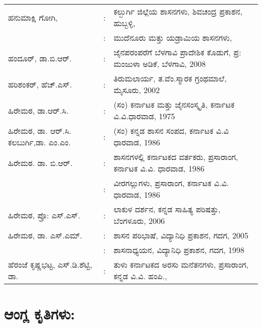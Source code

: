 \begin{longtable}[l]{@{}>{\raggedright}p{4.7cm}cp{9.2cm}<{\raggedright}@{}}
ಹನುಮಾಕ್ಷಿ ಗೋಗಿ, & : & ಕಲ್ಬುರ್ಗಿ ಜಿಲ್ಲೆಯ ಶಾಸನಗಳು, ಶಿವಚಂದ್ರ ಪ್ರಕಾಶನ, ಹುಬ್ಬಳ್ಳಿ,\\
& : & ಮುದೆನೂರು ಮತ್ತು ಯಡ್ರಾಮಿಯ ಶಾಸನಗಳು,\\
ಹಂದೂರ್​, ಡಾ.ಬಿ.ಆರ್​. & : & ಜೈನಪರಂಪರೆಗೆ ಬೆಳಗಾವಿ ಪ್ರಾದೇಶಿಕ ಕೊಡುಗೆ, ಪ್ರ: ಮಂಜುಳಾ ಅಡಿಕೆ, ಬೆಳಗಾವಿ, 2008\\
ಹರಿಶಂಕರ್​, ಹೆಚ್​.ಎಸ್​. & : & ತಿರುಮಲಾರ್ಯ, ತ.ವೆಂ.ಸ್ಮಾರಕ ಗ್ರಂಥಮಾಲೆ, ಮೈಸೂರು, 2002\\
ಹಿರೇಮಠ, ಡಾ.ಆರ್​.ಸಿ. & : & (ಸಂ) ಕರ್ನಾಟಕ ಮತ್ತು ಜೈನಸಂಸ್ಕೃತಿ, ಕರ್ನಾಟಕ ವಿ.ವಿ.ಧಾರವಾಡ, 1975\\
ಹಿರೇಮಠ, ಡಾ. ಆರ್​.ಸಿ. ಕಲಬುರ್ಗಿ,ಡಾ. ಎಂ.ಎಂ. & : &  (ಸಂ) ಕನ್ನಡ ಶಾಸನ ಸಂಪದ, ಕರ್ನಾಟಕ ವಿ.ವಿ ಧಾರವಾಡ, 1986\\
ಹಿರೇಮಠ. ಡಾ. ಬಿ.ಆರ್​. & : &  ಶಾಸನಗಳಲ್ಲಿ ಕರ್ನಾಟಕದ ವರ್ತಕರು, ಪ್ರಸಾರಾಂಗ, ಕರ್ನಾಟಕ ವಿ.ವಿ. ಧಾರವಾಡ, 1986\\
& : & ವೀರಗಲ್ಲುಗಳು, ಪ್ರಸಾರಾಂಗ, ಕರ್ನಾಟಕ ವಿ.ವಿ. ಧಾರವಾಡ, 1986\\
ಹಿರೇಮಠ, ಪ್ರೊ: ಎಸ್​.ಎಸ್​. & : &  ಲಾಕುಳ ದರ್ಶನ, ಕನ್ನಡ ಸಾಹಿತ್ಯ ಪರಿಷತ್ತು, ಬೆಂಗಳೂರು, 2006\\
ಹಿರೇಮಠ, ಡಾ. ಎಸ್​.ಎಮ್. & : & ಶಾಸನ ಪರಿಭಾಷೆ, ವಿದ್ಯಾನಿಧಿ ಪ್ರಕಾಶನ, ಗದಗ, 2005\\
& : & ಶಾಸನಾಧ್ಯಯನ, ವಿದ್ಯಾನಿಧಿ ಪ್ರಕಾಶನ, ಗದಗ, 1998\\
ಹೆರಂಜೆ ಕೃಷ್ಣಭಟ್ಟ, ಎಸ್​.ಡಿ.ಶೆಟ್ಟಿ, ಡಾ. & : &  ತುಳು ಕರ್ನಾಟಕದ ಅರಸು ಮನೆತನಗಳು, ಪ್ರಸಾರಾಂಗ, ಕನ್ನಡ ವಿ.ವಿ. ಹಂಪಿ.,
\end{longtable}

\newpage

\section*{ಆಂಗ್ಲ ಕೃತಿಗಳು:}

